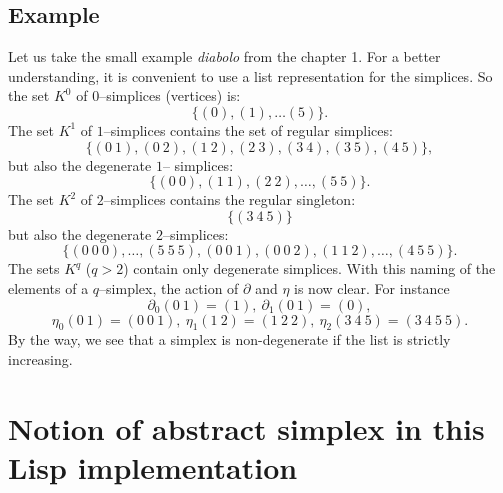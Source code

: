 \subsection* {Example}

Let us take the small example {\em diabolo} from the chapter 1.
For a better understanding, it is convenient to use a list representation for the
simplices. So the set $K^0$ of $0$--simplices (vertices) is:
$$\lbrace (0), (1),\ldots (5) \rbrace.$$
The set $K^1$ of $1$--simplices contains the set of regular simplices:
$$\lbrace (0\  1), (0\  2), (1\  2), (2\  3), (3\  4), (3\  5), (4\  5) \rbrace,$$
but also the degenerate $1$-- simplices:
$$\lbrace (0\ 0), (1\ 1), (2\ 2),\ldots,(5 \ 5) \rbrace.$$
The set $K^2$ of $2$--simplices contains the regular singleton:
$$\lbrace ( 3\  4\  5) \rbrace$$
but also the degenerate $2$--simplices:
$$\lbrace (0\ 0\ 0), \ldots, (5\ 5\ 5), (0\ 0\ 1), (0\ 0\  2), (1\ 1\ 2), \ldots, (4\ 5\ 5)\rbrace.$$
The sets $K^q$ ($q >2$) contain only degenerate simplices.
With this  naming of the elements of a $q$--simplex, the action of $\partial$ and $\eta$ is now clear. For
instance
$$\partial_0 (0\  1) = (1),\  \partial_1 (0\  1) = (0),$$
$$\eta_0 (0\  1) = (0\  0\  1),\
  \eta_1 (1\  2)= (1\  2\  2),\ \eta_2(3\ 4\ 5)=(3\ 4\ 5\ 5). $$
By the way, we see that a simplex is non-degenerate if the list is strictly increasing.

\section {Notion of abstract simplex in this Lisp implementation}

